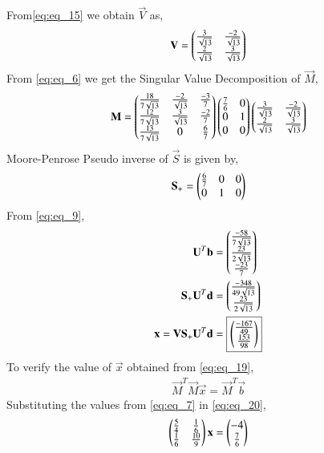 \documentclass[journal,12pt,twocolumn]{IEEEtran}
\begin{document}
From\eqref{eq:eq_15} we obtain $\vec{V}$ as,
\begin{align} \label{eq:eq_16}
    \mathbf{V} = \begin{pmatrix}\frac{3}{\sqrt{13}} & \frac{-2}{\sqrt{13}}\\ \frac{2}{\sqrt{13}} & \frac{3}{\sqrt{13}}\end{pmatrix}
\end{align}
From \eqref{eq:eq_6} we get the Singular Value Decomposition of $\vec{M}$,
\begin{align} \label{eq:eq_17}
    \mathbf{M} =  \begin{pmatrix}\tfrac{18}{7\sqrt{13}} & \frac{-2}{\sqrt{13}} &\tfrac{-3}{7} \\ \tfrac{12}{7\sqrt{13}} & \frac{3}{\sqrt{13}} & \tfrac{-2}{7}  \\  \tfrac{13}{7\sqrt{13}} & 0 & \tfrac{6}{7}\end{pmatrix} 
    \begin{pmatrix}\frac{7}{6} & 0 \\ 0 & 1 \\ 0 & 0\end{pmatrix}  \begin{pmatrix}\frac{3}{\sqrt{13}} & \frac{-2}{\sqrt{13}}\\ \frac{2}{\sqrt{13}} & \frac{3}{\sqrt{13}}\end{pmatrix}
\end{align}
Moore-Penrose Pseudo inverse of $\vec{S}$ is given by,
\begin{align} \label{eq:eq_18}
    \mathbf{S_+} =\begin{pmatrix}\frac{6}{7} & 0 & 0 \\ 0 & 1 &0 \end{pmatrix}
\end{align}
From \eqref{eq:eq_9},
\begin{align}
    \mathbf{U}^T\mathbf{b} &= \begin{pmatrix}\tfrac{-58}{7\sqrt{13}} \\ 
    \tfrac{23}{2\sqrt{13}} \\ \tfrac{-23}{7}\end{pmatrix} \nonumber \\
    \mathbf{S_+}\mathbf{U}^T\mathbf{d} &= \begin{pmatrix}\frac{-348}{49\sqrt{13}} \\ \frac{23}{2\sqrt{13}}\end{pmatrix} \nonumber \\
    \mathbf{x} = \mathbf{V}\mathbf{S_+}\mathbf{U}^T\mathbf{d} &= \boxed{\begin{pmatrix}\frac{-167}{49} \\ \frac{153}{98}\end{pmatrix}} \label{eq:eq_19}
\end{align}
To verify the value of $\vec{x}$ obtained from \eqref{eq:eq_19},
\begin{align} \label{eq:eq_20}
    \vec{M}^T\vec{M}\vec{x} = \vec{M}^T\vec{b}
\end{align}
Substituting the values from \eqref{eq:eq_7} in \eqref{eq:eq_20},
\begin{align}
    \begin{pmatrix}\frac{5}{4} & \frac{1}{6} \\\frac{1}{6} & \frac{10}{9}\end{pmatrix}\mathbf{x} = \begin{pmatrix}-4 \\ \frac{7}{6}\end{pmatrix} \nonumber
\end{align}
\end{document}
